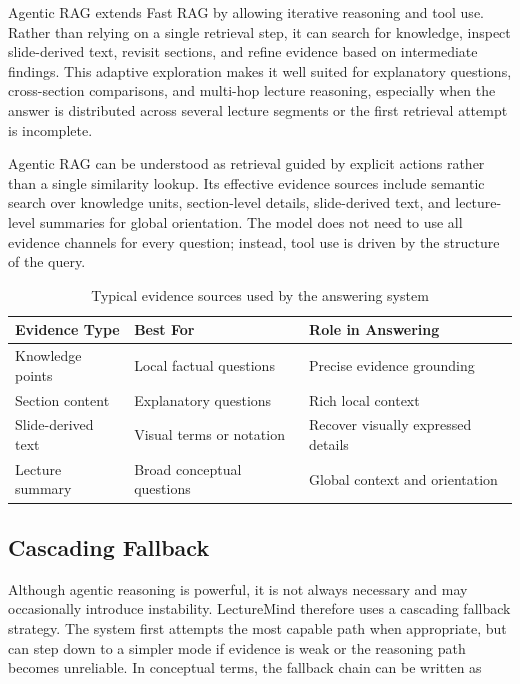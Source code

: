 Agentic RAG extends Fast RAG by allowing iterative reasoning and tool use. Rather than relying on a single retrieval step, it can search for knowledge, inspect slide-derived text, revisit sections, and refine evidence based on intermediate findings. This adaptive exploration makes it well suited for explanatory questions, cross-section comparisons, and multi-hop lecture reasoning, especially when the answer is distributed across several lecture segments or the first retrieval attempt is incomplete.

Agentic RAG can be understood as retrieval guided by explicit actions rather than a single similarity lookup. Its effective evidence sources include semantic search over knowledge units, section-level details, slide-derived text, and lecture-level summaries for global orientation. The model does not need to use all evidence channels for every question; instead, tool use is driven by the structure of the query.

\begin{table}[H]
    \centering
    \caption{Typical evidence sources used by the answering system}
    \begin{tabular}{@{}lll@{}}
        \toprule
        \textbf{Evidence Type} & \textbf{Best For} & \textbf{Role in Answering} \\ \midrule
        Knowledge points & Local factual questions & Precise evidence grounding \\
        Section content & Explanatory questions & Rich local context \\
        Slide-derived text & Visual terms or notation & Recover visually expressed details \\
        Lecture summary & Broad conceptual questions & Global context and orientation \\ \bottomrule
    \end{tabular}
\end{table}

\subsection{Cascading Fallback}

Although agentic reasoning is powerful, it is not always necessary and may occasionally introduce instability. LectureMind therefore uses a cascading fallback strategy. The system first attempts the most capable path when appropriate, but can step down to a simpler mode if evidence is weak or the reasoning path becomes unreliable. In conceptual terms, the fallback chain can be written as


